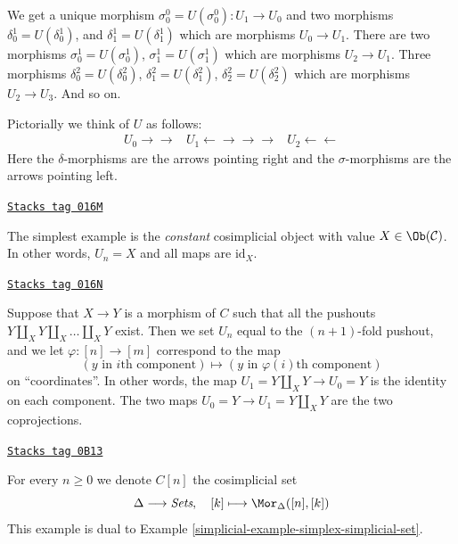 We get a unique morphism $\sigma^0_0 = U(\sigma^0_0) : U_1 \to U_0$ and
two morphisms $\delta^1_0 = U(\delta^1_0)$, and
$\delta^1_1 = U(\delta^1_1)$ which are morphisms $U_0 \to U_1$.
There are two morphisms
$\sigma^1_0 = U(\sigma^1_0)$, $\sigma^1_1 = U(\sigma^1_1)$
which are morphisms $U_2 \to U_1$. Three morphisms
$\delta^2_0 = U(\delta^2_0)$, $\delta^2_1 = U(\delta^2_1)$,
$\delta^2_2 = U(\delta^2_2)$
which are morphisms $U_2 \to U_3$. And so on.

\medskip\noindent
Pictorially we think of $U$ as follows:
$$
\begin{array}{ccc}U_0
\longrightarrow\longrightarrow & U_1
\longleftarrow\longrightarrow\longrightarrow\longrightarrow & U_2
\longleftarrow\longleftarrow\end{array}
$$
Here the $\delta$-morphisms are the arrows pointing right and the
$\sigma$-morphisms are the arrows pointing left.

\begin{example}
\label{simplicial-example-constant-cosimplicial-object}
\href{https://stacks.math.columbia.edu/tag/016M}{\texttt{Stacks tag 016M}}

The simplest example is the {\it constant} cosimplicial object with
value $X \in \Ob(\mathcal{C})$. In other words, $U_n = X$ and
all maps are $\text{id}_X$.
\end{example}

\begin{example}
\label{simplicial-example-push-outs-simplicial-object}
\href{https://stacks.math.columbia.edu/tag/016N}{\texttt{Stacks tag 016N}}

Suppose that $X\to Y$ is a morphism of $C$ such that all
the pushouts $Y\amalg_X Y \amalg_X \ldots \amalg_X Y$ exist.
Then we set $U_n$ equal to the $(n + 1)$-fold pushout,
and we let $\varphi : [n] \to [m]$ correspond to the map
$$
(y \text{ in }i\text{th component})
\mapsto
(y \text{ in }\varphi(i)\text{th component})
$$
on ``coordinates''.
In other words, the map $U_1 = Y \amalg_X Y \to U_0 = Y$ is the
identity on each component.
The two maps $U_0 = Y \to U_1 = Y \amalg_X Y$ are the two coprojections.
\end{example}

\begin{example}
\label{simplicial-example-simplex-cosimplicial-set}
\href{https://stacks.math.columbia.edu/tag/0B13}{\texttt{Stacks tag 0B13}}

For every $n \geq 0$ we denote $C[n]$ the cosimplicial set
$$
\Delta \longrightarrow \textit{Sets},\quad
[k] \longmapsto \Mor_{\Delta}([n], [k])
$$
This example is dual to Example \ref{simplicial-example-simplex-simplicial-set}.
\end{example}

